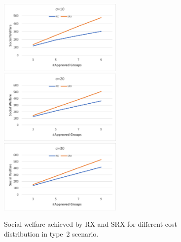 \documentclass[runningheads]{llncs}
\begin{document}
\begin{subappendices}
\begin{figure}[t]
\begin{center}
\includegraphics[width=6cm]{simulation/constant_substitutes_sw_10.png}
\includegraphics[width=6cm]{simulation/constant_substitutes_sw_20.png}
\includegraphics[width=6cm]{simulation/constant_substitutes_sw_30.png}
\caption{Social welfare achieved by RX and SRX for different cost distribution in type~2 scenario.
}\label{fig:sw_all2}
\end{center}
\end{figure}



\end{subappendices}
\end{document}
